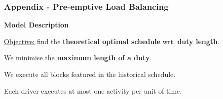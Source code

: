 \documentclass[handout]{beamer}
\begin{document}
\begin{frame}

	\frametitle{Appendix - Pre-emptive Load Balancing}
	
\vspace{\baselineskip}
			
		    \textbf{Model Description}
		    
			\begin{itemize}
				\small{\item \underline{Objective:} find the \textbf{theoretical optimal schedule} wrt. \textbf{duty length}.}
				\item We minimise the \textbf{maximum length of a duty}.
				\item We execute all blocks featured in the historical schedule.
				\item Each driver executes at most one activity per unit of time.
			\end{itemize}	
			
			\vspace{\baselineskip}
			\centering

\end{frame}
 
\end{document}
